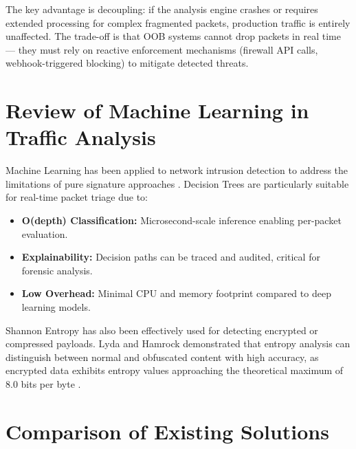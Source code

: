 The key advantage is decoupling: if the analysis engine crashes or requires extended processing for complex fragmented packets, production traffic is entirely unaffected. The trade-off is that OOB systems cannot drop packets in real time --- they must rely on reactive enforcement mechanisms (firewall API calls, webhook-triggered blocking) to mitigate detected threats.

\section{Review of Machine Learning in Traffic Analysis}

Machine Learning has been applied to network intrusion detection to address the limitations of pure signature approaches \cite{buczak2016mlids}. Decision Trees are particularly suitable for real-time packet triage due to:

\begin{itemize}
    \item \textbf{O(depth) Classification:} Microsecond-scale inference enabling per-packet evaluation.
    \item \textbf{Explainability:} Decision paths can be traced and audited, critical for forensic analysis.
    \item \textbf{Low Overhead:} Minimal CPU and memory footprint compared to deep learning models.
\end{itemize}

Shannon Entropy has also been effectively used for detecting encrypted or compressed payloads. Lyda and Hamrock \cite{lyda2007entropy} demonstrated that entropy analysis can distinguish between normal and obfuscated content with high accuracy, as encrypted data exhibits entropy values approaching the theoretical maximum of 8.0 bits per byte \cite{shannon1948}.

\section{Comparison of Existing Solutions}


